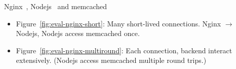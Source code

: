 Nginx~\cite{nginx}, Nodejs~\cite{nodejs} and memcached~\cite{memcached}

\begin{itemize}
	\item Figure~\ref{fig:eval-nginx-short}: Many short-lived connections. Nginx $\rightarrow$ Nodejs, Nodejs access memcached once.
	\item Figure~\ref{fig:eval-nginx-multiround}: Each connection, backend interact extensively. (Nodejs access memcached multiple round trips.)
\end{itemize}









